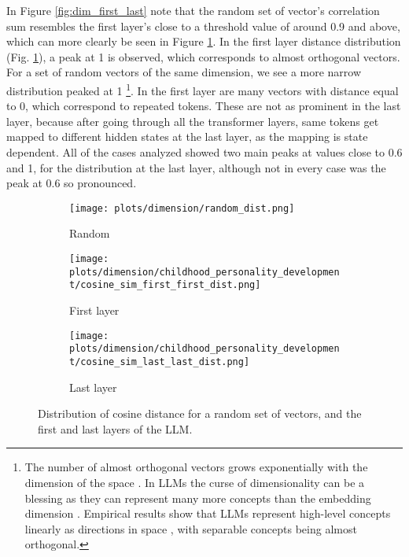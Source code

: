 \documentclass[a4paper,12pt]{article}
\begin{document}
In Figure \ref{fig:dim_first_last} note that the random set of vector's correlation sum resembles the first layer's close to a threshold value of around 0.9 and above, which can more clearly be seen in Figure \ref{fig:distribution_cos_dist}. In the first layer distance distribution (Fig. \ref{fig:distribution_cos_dist}), a peak at 1 is observed, which corresponds to almost orthogonal vectors. For a set of random vectors of the same dimension, we see a more narrow distribution peaked at 1 \footnote{The number of almost orthogonal vectors grows exponentially with the dimension of the space \cite{cai2013distributionsanglesrandompacking}. In LLMs the curse of dimensionality can be a blessing as they can represent many more concepts than the embedding dimension \cite{blessing}. Empirical results show that LLMs represent high-level concepts linearly as directions in space \cite{park2024linearrepresentationhypothesisgeometry}, with separable concepts being almost orthogonal.}.
In the first layer are many vectors with distance equal to 0, which correspond to repeated tokens. These are not as prominent in the last layer, because after going through all the transformer layers, same tokens get mapped to different hidden states at the last layer, as the mapping is state dependent. %
All of the cases analyzed showed two main peaks at values close to 0.6 and 1, for the distribution at the last layer, although not in every case was the peak at 0.6 so pronounced.


\begin{figure}[H]
    \centering
    \begin{subfigure}[b]{0.32\textwidth}
        \centering
        \texttt{[image: plots/dimension/random\_dist.png]}
        \caption{Random}
    \end{subfigure}\hfill
    \centering
    \begin{subfigure}[b]{0.32\linewidth}
        \centering
        \texttt{[image: plots/dimension/childhood\_personality\_development/cosine\_sim\_first\_first\_dist.png]}
        \caption{First layer}
    \end{subfigure}\hfill
    \begin{subfigure}[b]{0.32\linewidth}
        \centering
        \texttt{[image: plots/dimension/childhood\_personality\_development/cosine\_sim\_last\_last\_dist.png]}
        \caption{Last layer}
    \end{subfigure}

    \caption{Distribution of cosine distance for a random set of vectors, and the first and last layers of the LLM.}
    \label{fig:distribution_cos_dist}
\end{figure}
\end{document}
